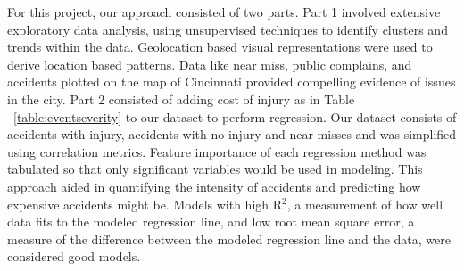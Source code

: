 \documentclass{llncs}
\begin{document}
For this project, our approach consisted of two parts. Part 1 involved extensive exploratory data analysis, using unsupervised techniques to identify clusters and trends within the data. Geolocation based visual representations were used to derive location based patterns. Data like near miss, public complains, and accidents plotted on the map of Cincinnati provided compelling evidence of issues in the city. Part 2 consisted of adding cost of injury as in Table ~\ref{table:eventseverity} to our dataset to perform regression.  Our dataset consists of accidents with injury, accidents with no injury and near misses and was simplified using correlation metrics. Feature importance  of each regression method was tabulated so that only significant variables would be used in modeling. This approach aided in quantifying the intensity of accidents and predicting how expensive accidents might be. Models with high R$^{2}$, a measurement of how well data fits to the modeled regression line, and low root mean square error, a measure of the difference between the modeled regression line and the data, were considered good models.
\end{document}
